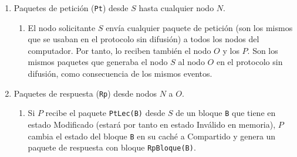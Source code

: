 \begin{enumerate}
    \item Paquetes de petición (\verb|Pt|) desde $S$ hasta cualquier nodo $N$.
    \begin{enumerate}
        \item El nodo solicitante $S$ envía cualquier paquete de petición (son los mismos que se usaban en el protocolo sin difusión) a todos los nodos del computador. Por tanto, lo reciben también el nodo $O$ y los $P$. Son los mismos paquetes que generaba el nodo $S$ al nodo $O$ en el protocolo sin  difusión, como consecuencia de los mismos eventos.
    \end{enumerate}
    \item Paquetes de respuesta (\verb|Rp|) desde nodos $N$ a $O$.
    \begin{enumerate}
        \item Si $P$ recibe el paquete \verb|PtLec(B)| desde $S$ de un bloque \verb|B| que tiene en estado Modificado (estará por tanto en estado Inválido en memoria), $P$ cambia el estado del bloque \verb|B| en su caché a Compartido y genera un paquete de respuesta con bloque \verb|RpBloque(B)|.


\end{enumerate}
\end{enumerate}
